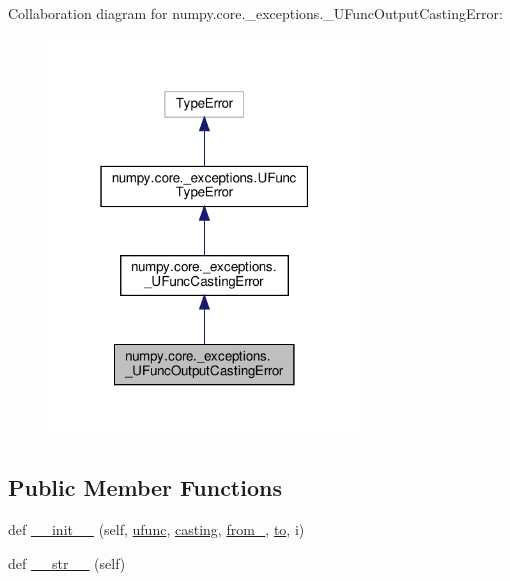 Collaboration diagram for numpy.\+core.\+\_\+exceptions.\+\_\+\+U\+Func\+Output\+Casting\+Error\+:
\nopagebreak
\begin{figure}[H]
\begin{center}
\leavevmode
\includegraphics[width=235pt]{classnumpy_1_1core_1_1__exceptions_1_1__UFuncOutputCastingError__coll__graph}
\end{center}
\end{figure}
\subsection*{Public Member Functions}
\begin{DoxyCompactItemize}
\item 
def \hyperlink{classnumpy_1_1core_1_1__exceptions_1_1__UFuncOutputCastingError_a890ecc362bac4dd2d0d8e4dba2b2a39a}{\+\_\+\+\_\+init\+\_\+\+\_\+} (self, \hyperlink{classnumpy_1_1core_1_1__exceptions_1_1UFuncTypeError_a10866e4bfc9971e5aa77e8cd1c9e04f4}{ufunc}, \hyperlink{classnumpy_1_1core_1_1__exceptions_1_1__UFuncCastingError_aa7f02b5f0d75e682745e4209562dd04b}{casting}, \hyperlink{classnumpy_1_1core_1_1__exceptions_1_1__UFuncCastingError_a22df479bb7b9fed1dbd3d8701220edae}{from\+\_\+}, \hyperlink{classnumpy_1_1core_1_1__exceptions_1_1__UFuncCastingError_ab32680c508e0a39838f7996773627e68}{to}, i)
\item 
def \hyperlink{classnumpy_1_1core_1_1__exceptions_1_1__UFuncOutputCastingError_aace67f25242d052798a1b88fa58c0789}{\+\_\+\+\_\+str\+\_\+\+\_\+} (self)
\end{DoxyCompactItemize}
